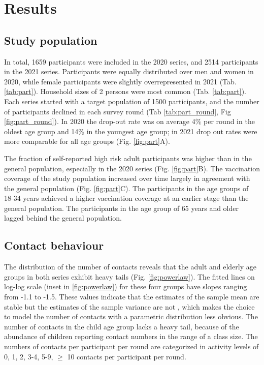 \documentclass[fleqn,10pt]{wlscirep}
\begin{document}
\section*{Results}

\subsection*{Study population}

In total, 1659 participants were included in the 2020 series, and 2514 participants in the 2021 series. Participants were equally distributed over men and women in 2020, while female participants were slightly overrepresented in 2021 (Tab. \ref{tab:part}). Household sizes of 2 persons were most common (Tab. \ref{tab:part}). Each series started with a target population of 1500 participants, and the number of participants declined in each survey round (Tab \ref{tab:part_round}, Fig \ref{fig:part_round}). In 2020 the drop-out rate was on average 4\% per round in the oldest age group and 14\% in the youngest age group; in 2021 drop out rates were more comparable for all age groups (Fig. \ref{fig:part}A).

The fraction of self-reported high risk adult participants was higher than in the general population, especially in the 2020 series (Fig. \ref{fig:part}B). The vaccination coverage of the study population increased over time largely in agreement with the general population (Fig. \ref{fig:part}C). The participants in the age groups of 18-34 years achieved a higher vaccination coverage at an earlier stage than the general population. The participants in the age group of 65 years and older lagged behind the general population.


\subsection*{Contact behaviour}

The distribution of the number of contacts reveals that the adult and elderly age groups in both series exhibit heavy tails (Fig. \ref{fig:powerlaw}). The fitted lines on log-log scale (inset in \ref{fig:powerlaw}) for these four groups have slopes ranging from -1.1 to -1.5. These values indicate that the estimates of the sample mean are stable but the estimates of the sample variance are not \cite{Tagore_2015}, which makes the choice to model the number of contacts with a parametric distribution less obvious. The number of contacts in the child age group lacks a heavy tail, because of the abundance of children reporting contact numbers in the range of a class size. The numbers of contacts per participant per round are categorized in activity levels of 0, 1, 2, 3-4, 5-9, $\geq$ 10 contacts per participant per round.
\end{document}
